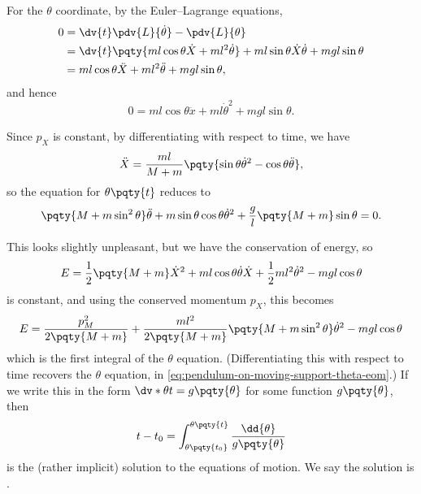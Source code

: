 \begin{example}
    For the \(\theta\) coordinate, by the Euler--Lagrange equations,
    \begin{subequations}
        \begin{align}
            0 &= \dv{t} \pdv{L}{\dot{\theta}} - \pdv{L}{\theta} \\
            &= \dv{t} \pqty{m l \cos \theta \dot{X} + m l^2 \dot{\theta}} + m l \sin \theta \dot{X} \dot{\theta} + m g l \sin \theta \\
            &= m l \cos \theta \ddot{X} + m l^2 \ddot{\theta} + m g l \sin \theta,
        \end{align}
    \end{subequations}
    and hence
    \begin{equation}
        0 = m l \cos \theta \ddot{x} + m l \dot{\theta}^2 + m g l \sin \theta.
    \end{equation}

    Since \(p_X\) is constant, by differentiating with respect to time, we have
    \begin{equation}
        \ddot{X} = \frac{ml}{M + m} \pqty{\sin \theta \dot{\theta}^2 - \cos \theta \ddot{\theta}},
    \end{equation}
    so the equation for \(\theta\pqty{t}\) reduces to
    \begin{equation}
        \label{eq:pendulum-on-moving-support-theta-eom}%
        \pqty{M + m \sin^2 \theta} \ddot{\theta} + m \sin \theta \cos \theta \dot{\theta}^2 + \frac{g}{l} \pqty{M + m} \sin \theta = 0.
    \end{equation}

    This looks slightly unpleasant, but we have the conservation of energy, so
    \begin{equation}
        E = \frac{1}{2} \pqty{M + m} \dot{X}^2 + ml \cos \theta \dot{\theta} \dot{X} + \frac{1}{2} m l^2 \dot{\theta}^2 - mgl \cos \theta
    \end{equation}
    is constant, and using the conserved momentum \(p_X\), this becomes
    \begin{equation}
        E = \frac{p_M^2}{2 \pqty{M + m}} + \frac{m l^2}{2 \pqty{M + m}} \pqty{M + m \sin^2 \theta} \dot{\theta}^2 - m g l \cos \theta
    \end{equation}
    which is the first integral of the \(\theta\) equation. (Differentiating this with respect to time recovers the \(\theta\) equation, in \eqref{eq:pendulum-on-moving-support-theta-eom}.) If we write this in the form \(\dv*{\theta}{t} = g\pqty{\theta}\) for some function \(g\pqty{\theta}\), then
    \begin{equation}
        t - t_0 = \int_{\theta\pqty{t_0}}^{\theta\pqty{t}} \frac{\dd{\theta}}{g\pqty{\theta}}
    \end{equation}
    is the (rather implicit) solution to the equations of motion. We say the solution is .
\end{example}

